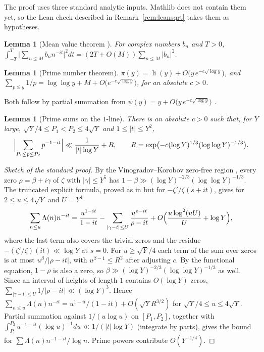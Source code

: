 \documentclass[11pt,letterpaper]{article}
\newtheorem{lemma}[theorem]{Lemma}
\theoremstyle{remark}
\begin{document}
The proof uses three standard analytic inputs. Mathlib does not contain them
yet, so the Lean check described in Remark~\ref{rem:leansqrt} takes them as
hypotheses.

\begin{lemma}[Mean value theorem {\cite{mvhilbert}}]\label{lem:mvt}
For complex numbers $b_n$ and $T>0$,
$\int_{-T}^{T}\bigl|\sum_{n\le M}b_nn^{-it}\bigr|^2dt=(2T+O(M))\sum_{n\le M}|b_n|^2$.
\end{lemma}

\begin{lemma}[Prime number theorem]\label{lem:pnt}
$\pi(y)=\operatorname{li}(y)+O\bigl(y\,e^{-c\sqrt{\log y}}\bigr)$, and
$\sum_{p\le y}1/p=\log\log y+M+O\bigl(e^{-c\sqrt{\log y}}\bigr)$, for an absolute
$c>0$.
\end{lemma}

Both follow by partial summation from
$\psi(y)=y+O\bigl(y\,e^{-c\sqrt{\log y}}\bigr)$ \cite[Ch.~18]{davenport}.

\begin{lemma}[Prime sums on the $1$-line]\label{lem:vk}
There is an absolute $c>0$ such that, for $Y$ large, $\sqrt Y/4\le P_1<P_2\le4\sqrt Y$
and $1\le|t|\le Y^2$,
\[
\Bigl|\sum_{P_1\le p\le P_2}p^{-1-it}\Bigr|\ll\frac{1}{|t|\log Y}+R,\qquad
R=\exp\bigl(-c(\log Y)^{1/3}(\log\log Y)^{-1/3}\bigr).
\]
\end{lemma}

\begin{proof}[Sketch of the standard proof]
By the Vinogradov--Korobov zero-free region \cite[Ch.~6]{titchmarsh}, every zero
$\rho=\beta+i\gamma$ of $\zeta$ with $|\gamma|\le Y^5$ has
$1-\beta\gg(\log Y)^{-2/3}(\log\log Y)^{-1/3}$. The truncated explicit formula,
proved as in \cite[Ch.~17]{davenport} but for $-\zeta'/\zeta(s+it)$, gives for
$2\le u\le 4\sqrt Y$ and $U=Y^4$
\[
\sum_{n\le u}\Lambda(n)n^{-it}=\frac{u^{1-it}}{1-it}
-\sum_{|\gamma-t|\le U}\frac{u^{\rho-it}}{\rho-it}+O\Bigl(\frac{u\log^2(uU)}{U}+\log Y\Bigr),
\]
where the last term also covers the trivial zeros and the residue
$-(\zeta'/\zeta)(it)\ll\log Y$ at $s=0$.
For $u\ge\sqrt Y/4$ each term of the sum over zeros is at most
$u^{\beta}/|\rho-it|$, with $u^{\beta-1}\le R^2$ after adjusting $c$. By the
functional equation, $1-\rho$ is also a zero, so $\beta\gg(\log Y)^{-2/3}(\log\log Y)^{-1/3}$
as well. Since an interval of heights of length $1$ contains $O(\log Y)$ zeros,
$\sum_{|\gamma-t|\le U}1/|\rho-it|\ll(\log Y)^3$. Hence
$\sum_{n\le u}\Lambda(n)n^{-it}=u^{1-it}/(1-it)+O(\sqrt Y R^{3/2})$ for
$\sqrt Y/4\le u\le 4\sqrt Y$. Partial summation against $1/(u\log u)$ on
$[P_1,P_2]$, together with
$\int_{P_1}^{P_2}u^{-1-it}(\log u)^{-1}du\ll1/(|t|\log Y)$ (integrate by parts),
gives the bound for $\sum\Lambda(n)n^{-1-it}/\log n$. Prime powers contribute
$O(Y^{-1/4})$.
\end{proof}
\end{document}
